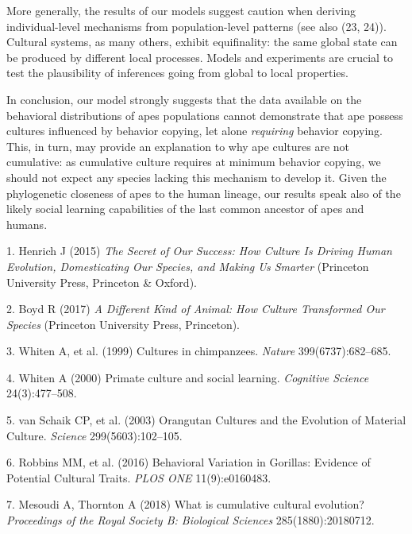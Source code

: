\documentclass[9pt,twocolumn,twoside,]{pnas-new}
\begin{document}
More generally, the results of our models suggest caution when deriving
individual-level mechanisms from population-level patterns (see also
(23, 24)). Cultural systems, as many others, exhibit equifinality: the
same global state can be produced by different local processes. Models
and experiments are crucial to test the plausibility of inferences going
from global to local properties.

In conclusion, our model strongly suggests that the data available on
the behavioral distributions of apes populations cannot demonstrate that
ape possess cultures influenced by behavior copying, let alone
\emph{requiring} behavior copying. This, in turn, may provide an
explanation to why ape cultures are not cumulative: as cumulative
culture requires at minimum behavior copying, we should not expect any
species lacking this mechanism to develop it. Given the phylogenetic
closeness of apes to the human lineage, our results speak also of the
likely social learning capabilities of the last common ancestor of apes
and humans.

\showmatmethods
\showacknow
\pnasbreak

\hypertarget{refs}{}
\hypertarget{ref-henrich_secret_2015}{}
1. Henrich J (2015) \emph{The Secret of Our Success: How Culture Is
Driving Human Evolution, Domesticating Our Species, and Making Us
Smarter} (Princeton University Press, Princeton \& Oxford).

\hypertarget{ref-boyd_different_2017}{}
2. Boyd R (2017) \emph{A Different Kind of Animal: How Culture
Transformed Our Species} (Princeton University Press, Princeton).

\hypertarget{ref-whiten_cultures_1999}{}
3. Whiten A, et al. (1999) Cultures in chimpanzees. \emph{Nature}
399(6737):682--685.

\hypertarget{ref-whiten_primate_2000}{}
4. Whiten A (2000) Primate culture and social learning. \emph{Cognitive
Science} 24(3):477--508.

\hypertarget{ref-van_schaik_orangutan_2003}{}
5. van Schaik CP, et al. (2003) Orangutan Cultures and the Evolution of
Material Culture. \emph{Science} 299(5603):102--105.

\hypertarget{ref-robbins_behavioral_2016}{}
6. Robbins MM, et al. (2016) Behavioral Variation in Gorillas: Evidence
of Potential Cultural Traits. \emph{PLOS ONE} 11(9):e0160483.

\hypertarget{ref-mesoudi_what_2018}{}
7. Mesoudi A, Thornton A (2018) What is cumulative cultural evolution?
\emph{Proceedings of the Royal Society B: Biological Sciences}
285(1880):20180712.
\end{document}
